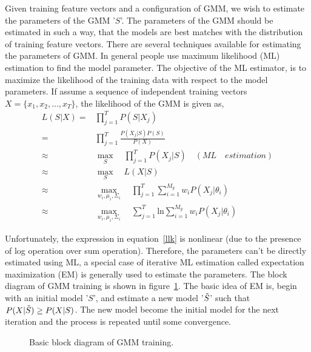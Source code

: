 \begin{spacing}{1.5}
Given training feature vectors and a configuration of GMM, we wish to estimate the parameters of the GMM '$S$'. The parameters of the GMM should be estimated in such a way, that the models are best matches with the distribution of training feature vectors. There are several techniques available for estimating the parameters of GMM. In general people use maximum likelihood (ML) estimation to find the model parameter. The objective of the ML estimator, is to maximize the likelihood of the training data with respect to the model parameters. If assume a sequence of independent training vectors $X=\{x_{1}, x_{2},\ldots,x_{T}\}$, the likelihood of the GMM is given as,
\begin{equation}
\label{llk}
\begin{aligned}
 L(S|X)=&\prod_{j=1}^{T}P(S|X_{j})\\
        =&\prod_{j=1}^{T}\frac{P(X_{j}|S) P(S)}{P(X)}\\
        \approx&\max_{S} \quad \prod_{j=1}^{T}P(X_{j}|S) \quad  (ML \quad estimation)\\
        \approx&\max_{S}\quad L(X|S)\\
       \approx&\max_{w_{i},\mu_{i},\Sigma_{i}}\quad \prod_{j=1}^{T}\sum_{i=1}^{M_{g}}w_{i}P(X_{j}|\theta_{i})\\
       \approx&\max_{w_{i},\mu_{i},\Sigma_{i}} \quad \sum_{j=1}^{T}\mbox{ln}\sum_{i=1}^{M_{g}}w_{i}P(X_{j}|\theta_{i})
 \end{aligned}
\end{equation}


Unfortunately, the expression in equation~\ref{llk} is nonlinear (due to the presence of log operation over sum operation). Therefore, the parameters can't be directly estimated using ML, a special case of iterative ML estimation called expectation maximization (EM) is generally used to estimate the parameters. The block diagram of GMM training is shown in figure~\ref{gem}. The basic idea of EM is, begin with an initial model '$S$',  and estimate a new model '$\Tilde{S}$' such that $P(X|\Tilde{S}) \geq P(X|S)$. The new model become the initial model for the next iteration and the process is repeated until some convergence. 
\begin{figure}[h]
\caption{Basic block diagram of GMM training.}
\label{gem}
\end{figure} 

\end{spacing}
